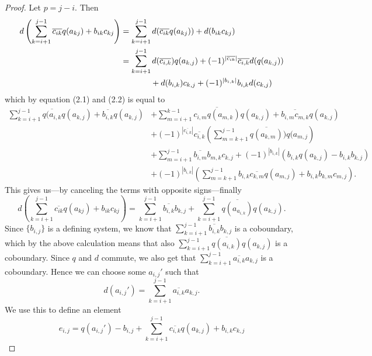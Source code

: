 \begin{proof}
Let $p = j-i$. Then 
\begin{align*}
    d\left(\sum_{k=i+1}^{j-1}\overline{c_{ik}}q(a_{kj})+b_{ik}c_{kj}\right)
    &= \sum_{k=i+1}^{j-1}d(\overline{c_{ik}}q(a_{kj}))+d(b_{ik}c_{kj}) \\
    &= \sum_{k=i+1}^{j-1} d(\overline{c_{i,k}})q(a_{k,j}) + (-1)^{|\overline{c_{ik}}|}\overline{c_{i,k}}d(q(a_{k,j})) \\
    &\hspace{13mm}+ 
    d(b_{i,k})c_{k,j} + (-1)^{|b_{i,k}|}b_{i,k}d(c_{k,j})
\end{align*}
which by equation (2.1) and (2.2) is equal to  
\begin{align*}
\sum_{k=i+1}^{j-1} \overline{q(a_{i,k}}q(a_{k,j}) + \overline{b_{i,k}}q(a_{k,j})
    &+ 
    \sum_{m = i+1}^{k-1}\overline{c_{i,m}q(a_{m,k})}q(a_{k,j}) + \overline{b_{i,m}c_{m,k}}q(a_{k,j}) \\
    &+ 
    (-1)^{|\overline{c_{i,k}}|}\overline{c_{i,k}}\left(\sum_{m=k+1}^{j-1}\overline{q(a_{k,m})})q(a_{m,j}\right) \\
    &+ 
    \sum_{m=i+1}^{j-1}\overline{b_{i,m}}b_{m,k}c_{k,j} + (-1)^{|b_{i,k}|}(b_{i,k}q(a_{k,j}) - b_{i,k}b_{k,j}) \\
    &+ 
    (-1)^{|b_{i,k}|}\left(\sum_{m=k+1}^{j-1}b_{i,k}\overline{c_{k,m}}q(a_{m,j})+b_{i,k}b_{k,m}c_{m,j}\right).
\end{align*}
This gives us---by canceling the terms with opposite signs---finally
\begin{equation*}
d\left(\sum_{k=i+1}^{j-1}\overline{c_{ik}}q(a_{kj})+b_{ik}c_{kj}\right) = \sum_{k=i+1}^{j-1}\overline{b_{i,k}}b_{k,j} + \sum_{k=i+1}^{j-1}\overline{q(a_{a_{i,k}})}q(a_{k,j}).
\end{equation*}
Since $\{b_{i,j}\}$ is a defining system, we know that $\sum_{k=i+1}^{j-1}\overline{b_{i,k}}b_{k,j}$ is a coboundary, which by the above calculation means that also $\sum_{k=i+1}^{j-1}\overline{q(a_{i,k})}q(a_{k,j})$ is a coboundary. Since $q$ and $d$ commute, we also get that $\sum_{k=i+1}^{j-1}\overline{a_{i,k}}a_{k,j}$ is a coboundary. Hence we can choose some $a_{i,j}'$ such that
\begin{equation*}
    d(a_{i,j}') = \sum_{k=i+1}^{j-1}\overline{a_{i,k}}a_{k,j}.    
\end{equation*}
We use this to define an element 
\begin{equation*}
    e_{i,j} = q(a_{i,j}') - b_{i,j} + \sum_{k=i+1}^{j-1}\overline{c_{i,k}}q(a_{k,j})+b_{i,k}c_{k,j}
\end{equation*}

\end{proof}
